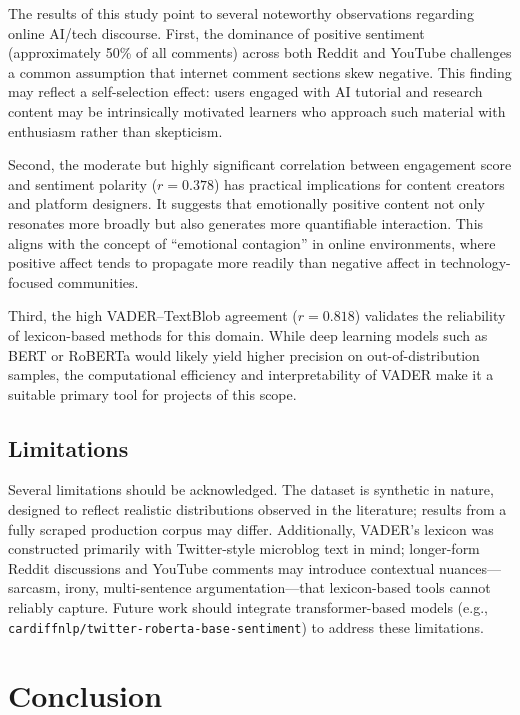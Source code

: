 \documentclass[conference]{IEEEtran}
\begin{document}
The results of this study point to several noteworthy observations regarding
online AI/tech discourse. First, the dominance of positive sentiment
(approximately 50\% of all comments) across both Reddit and YouTube
challenges a common assumption that internet comment sections skew negative.
This finding may reflect a self-selection effect: users engaged with AI
tutorial and research content may be intrinsically motivated learners
who approach such material with enthusiasm rather than skepticism.

Second, the moderate but highly significant correlation between engagement
score and sentiment polarity ($r = 0.378$) has practical implications for
content creators and platform designers. It suggests that emotionally positive
content not only resonates more broadly but also generates more quantifiable
interaction. This aligns with the concept of ``emotional contagion'' in
online environments, where positive affect tends to propagate more readily
than negative affect in technology-focused communities.

Third, the high VADER--TextBlob agreement ($r = 0.818$) validates the
reliability of lexicon-based methods for this domain. While deep learning
models such as BERT or RoBERTa would likely yield higher precision on
out-of-distribution samples, the computational efficiency and
interpretability of VADER make it a suitable primary tool for projects
of this scope.

\subsection{Limitations}

Several limitations should be acknowledged. The dataset is synthetic in
nature, designed to reflect realistic distributions observed in the
literature; results from a fully scraped production corpus may differ.
Additionally, VADER's lexicon was constructed primarily with Twitter-style
microblog text in mind; longer-form Reddit discussions and YouTube comments
may introduce contextual nuances---sarcasm, irony, multi-sentence
argumentation---that lexicon-based tools cannot reliably capture. Future
work should integrate transformer-based models (e.g., \texttt{cardiffnlp/twitter-roberta-base-sentiment})
to address these limitations.

\section{Conclusion}
\end{document}
